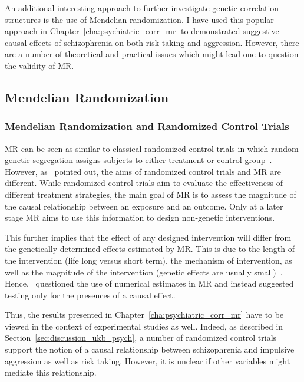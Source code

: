 An additional interesting approach to further investigate genetic correlation structures is the use of Mendelian randomization.
I have used this popular approach in Chapter~\ref{cha:psychiatric_corr_mr} to demonstrated suggestive causal effects of schizophrenia on both risk taking and aggression.
However, there are a number of theoretical and practical issues which might lead one to question the validity of MR\@.

\subsection{Mendelian Randomization}
\label{sub:mendelian_randomization_discussion}

\subsubsection{Mendelian Randomization and Randomized Control Trials}
\label{ssub:causality_and_mendelian_randomization}

MR can be seen as similar to classical randomized control trials in which random genetic segregation  assigns subjects to either treatment or control group~\cite{Hingorani2005}.
However, as~\citet{Burgess2016a} pointed out, the aims of randomized control trials and MR are different.
While randomized control trials aim to evaluate the effectiveness of different treatment strategies, the main goal of MR is to assess the magnitude of the causal relationship between an exposure and an outcome. 
Only at a later stage MR aims to use this information to design non-genetic interventions.

This further implies that the effect of any designed intervention will differ from the genetically determined effects estimated by MR\@.
This is due to the length of the intervention (life long versus short term), the mechanism of intervention, as well as the magnitude of the intervention (genetic effects are usually small)~\cite{Evans2015}. 
Hence,~\citet{Vanderweele2015} questioned the use of  numerical estimates in MR and instead suggested testing only for the presences of a causal effect.

Thus, the results presented in Chapter~\ref{cha:psychiatric_corr_mr} have to be viewed in the context of experimental studies as well.
Indeed, as described in Section~\ref{sec:discussion_ukb_psych}, a number of randomized control trials support the notion of a causal relationship between schizophrenia and impulsive aggression as well as risk taking. 
However, it is unclear if other variables might mediate this relationship.

